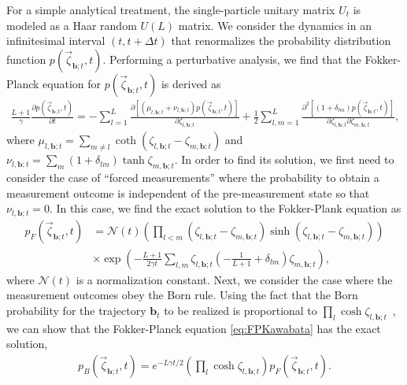 \documentclass[preprint,pteplogo]{ptephy_v2}%
\numberwithin{equation}{section}
\theoremstyle{definition}
\begin{document}
For a simple analytical treatment, the single-particle unitary matrix $U_t$ is modeled as a Haar random $U(L)$ matrix.
We consider the dynamics in an infinitesimal interval $(t, t+\Delta t)$ that renormalizes the probability distribution function $p(\vec{\zeta}_{\bm{b};t},t)$.
Performing a perturbative analysis, we find that the Fokker-Planck equation for $p(\vec{\zeta}_{\bm{b};t},t)$ is derived as
\begin{align} \label{eq:FPKawabata}
    \frac{L+1}{\gamma}\frac{\partial p(\vec{\zeta}_{\bm{b};t},t)}{\partial t} = -\sum_{l=1}^L \frac{\partial [(\mu_{l, \bm{b};t} + \nu_{l, \bm{b};t})p(\vec{\zeta}_{\bm{b};t},t)]}{\partial \zeta_{l, \bm{b};t}} + \frac{1}{2}\sum_{l,m=1}^L\frac{\partial^2[(1+\delta_{lm})p(\vec{\zeta}_{\bm{b};t},t)]}{\partial\zeta_{l, \bm{b};t}\partial\zeta_{m, \bm{b};t}},
\end{align}
where $\mu_{l, \bm{b};t} = \sum_{m\neq l}\coth(\zeta_{l, \bm{b};t}-\zeta_{m, \bm{b};t})$ and $\nu_{l, \bm{b};t} = \sum_m(1+\delta_{lm})\tanh \zeta_{m, \bm{b};t}$.
In order to find its solution, we first need to consider the case of ``forced measurements'' where the probability to obtain a measurement outcome is independent of the pre-measurement state so that $\nu_{l, \bm{b};t}=0$.
In this case, we find the exact solution to the Fokker-Plank equation as
\begin{align}
    p_F(\vec{\zeta}_{\bm{b};t}, t)
    &=\mathcal{N}(t)\left(\prod_{l<m}(\zeta_{l, \bm{b};t}-\zeta_{m, \bm{b};t})\sinh(\zeta_{l, \bm{b};t} - \zeta_{m, \bm{b};t})\right) \nonumber\\
    &\times \exp\left(-\frac{L+1}{2\gamma t}\sum_{l,m}\zeta_{l, \bm{b};t}\left(-\frac{1}{L+1}+\delta_{l m}\right)\zeta_{m, \bm{b};t}\right),
\end{align}
where $\mathcal{N}(t)$ is a normalization constant.
Next, we consider the case where the measurement outcomes obey the Born rule.
Using the fact that the Born probability for the trajectory $\bm{b}_t$ to be realized is proportional to $\prod_{l}\cosh \zeta_{l, \bm{b};t}$~\cite{Cheong2004many}, we can show that the Fokker-Planck equation \eqref{eq:FPKawabata} has the exact solution, 
\begin{align}
    p_B(\vec{\zeta}_{\bm{b};t}, t) = e^{-L\gamma t/2}\left(\prod_{l}\cosh \zeta_{l, \bm{b};t}\right)p_F(\vec{\zeta}_{\bm{b};t}, t).
\end{align}
\end{document}

